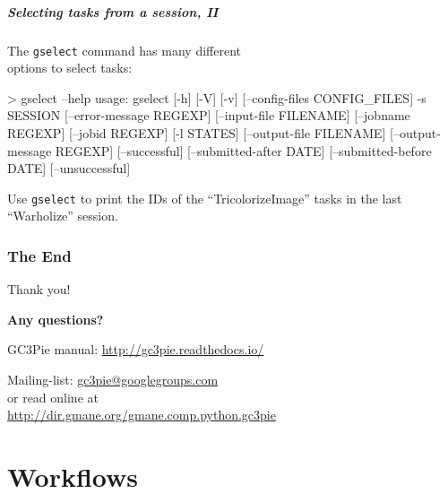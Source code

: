 \documentclass[english,serif,mathserif,usenames,dvipsnames]{beamer}
\begin{document}
\begin{frame}[fragile]
  \frametitle{Selecting tasks from a session, II}

  The \texttt{gselect} command has many different \\ options to select tasks:
  \begin{stdout}
> gselect --help
usage: gselect [-h] [-V] [-v] [--config-files CONFIG_FILES] -s SESSION
               [--error-message REGEXP] [--input-file FILENAME]
               [--jobname REGEXP] [--jobid REGEXP] [-l STATES]
               [--output-file FILENAME] [--output-message REGEXP]
               [--successful] [--submitted-after DATE]
               [--submitted-before DATE] [--unsuccessful]
  \end{stdout}

  \+
  \begin{exercise*}
    Use \texttt{gselect} to print the IDs of the ``TricolorizeImage''
    tasks in the last ``Warholize'' session.
  \end{exercise*}
\end{frame}



\section{The End}

\begin{frame}[fragile]
  \begin{center}
    Thank you!

    \+
    {\Huge \textbf{Any questions?}}

    \+\+
    GC3Pie manual: \url{http://gc3pie.readthedocs.io/}

    \+\+
    Mailing-list: \url{gc3pie@googlegroups.com} \\
    or read online at \\
    \url{http://dir.gmane.org/gmane.comp.python.gc3pie}
  \end{center}
\end{frame}


\part{Workflows}
\end{document}
